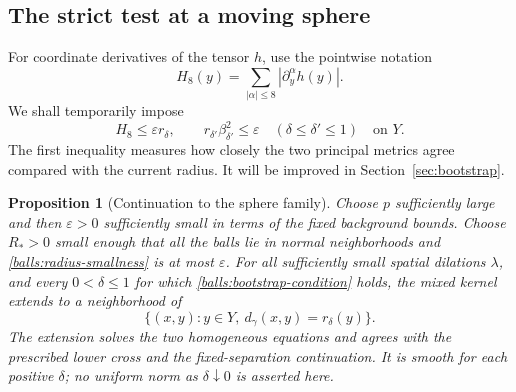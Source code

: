 \documentclass[11pt]{article}
\newtheorem{proposition}[theorem]{Proposition}
\theoremstyle{definition}
\theoremstyle{remark}
\numberwithin{equation}{section}
\begin{document}
\subsection{The strict test at a moving sphere}

For coordinate derivatives of the tensor $h$, use the pointwise notation
\[
 H_8(y)=\sum_{|\alpha|\leq8}|\partial_y^\alpha h(y)|.
\]
We shall temporarily impose
\begin{equation}\label{balls:bootstrap-condition}
 H_8\leq\varepsilon r_\delta,\qquad
 r_{\delta'}\beta_{\delta'}^2\leq\varepsilon
       \quad(\delta\leq\delta'\leq1)
 \quad\text{on }Y.
\end{equation}
The first inequality measures how closely the two principal metrics
agree compared with the current radius.  It will be improved in
Section~\ref{sec:bootstrap}.

\begin{proposition}[Continuation to the sphere family]\label{balls:continuation}
Choose $p$ sufficiently large and then $\varepsilon>0$ sufficiently small
in terms of the fixed background bounds.  Choose $R_*>0$ small enough
that all the balls lie in normal neighborhoods and
\eqref{balls:radius-smallness} is at most $\varepsilon$.
For all sufficiently small spatial dilations $\lambda$, and every
$0<\delta\le1$ for which \eqref{balls:bootstrap-condition} holds, the mixed
kernel extends to a neighborhood of
\[
 \{(x,y):y\in Y,\ d_\gamma(x,y)=r_\delta(y)\}.
\]
The extension solves the two homogeneous equations and agrees with the
prescribed lower cross and the fixed-separation continuation.  It is
smooth for each positive $\delta$; no uniform norm as $\delta\downarrow0$
is asserted here.
\end{proposition}
\end{document}
